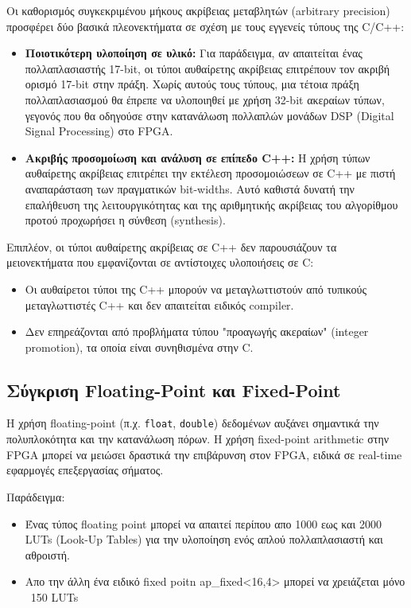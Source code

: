 Οι καθορισμός συγκεκριμένου μήκους ακρίβειας μεταβλητών (arbitrary precision) προσφέρει δύο βασικά πλεονεκτήματα σε σχέση με τους εγγενείς τύπους της C/C++:
\begin{itemize}
  \item \textbf{Ποιοτικότερη υλοποίηση σε υλικό:} Για παράδειγμα, αν απαιτείται ένας πολλαπλασιαστής 17-bit, οι τύποι αυθαίρετης ακρίβειας επιτρέπουν τον ακριβή ορισμό 17-bit στην πράξη.
  Χωρίς αυτούς τους τύπους, μια τέτοια πράξη πολλαπλασιασμού θα έπρεπε να υλοποιηθεί με χρήση 32-bit ακεραίων τύπων, γεγονός που θα οδηγούσε στην κατανάλωση πολλαπλών μονάδων DSP (Digital Signal Processing) στο FPGA.
  \item \textbf{Ακριβής προσομοίωση και ανάλυση σε επίπεδο C++:} Η χρήση τύπων αυθαίρετης ακρίβειας επιτρέπει την εκτέλεση προσομοιώσεων σε C++ με πιστή αναπαράσταση των πραγματικών bit-widths. Αυτό καθιστά δυνατή την επαλήθευση της λειτουργικότητας και της αριθμητικής ακρίβειας του αλγορίθμου προτού προχωρήσει η σύνθεση (synthesis).
\end{itemize}

Επιπλέον, οι τύποι αυθαίρετης ακρίβειας σε C++ δεν παρουσιάζουν τα μειονεκτήματα που εμφανίζονται σε αντίστοιχες υλοποιήσεις σε C:
\begin{itemize}
  \item Οι αυθαίρετοι τύποι της C++ μπορούν να μεταγλωττιστούν από τυπικούς μεταγλωττιστές C++ και δεν απαιτείται ειδικός compiler.
  \item Δεν επηρεάζονται από προβλήματα τύπου "προαγωγής ακεραίων" (integer promotion), τα οποία είναι συνηθισμένα στην C.
\end{itemize}

\subsection{Σύγκριση Floating-Point και Fixed-Point}
Η χρήση floating-point (π.χ. \texttt{float}, \texttt{double}) δεδομένων αυξάνει σημαντικά την πολυπλοκότητα και την κατανάλωση πόρων.
Η χρήση fixed-point arithmetic στην FPGA μπορεί να μειώσει δραστικά την επιβάρυνση στον FPGA, ειδικά σε real-time εφαρμογές επεξεργασίας σήματος.

Παράδειγμα:
\begin{itemize}
  \item Ένας τύπος floating point μπορεί να απαιτεί περίπου απο 1000 εως και 2000 LUTs (Look-Up Tables) για την υλοποίηση ενός απλού πολλαπλασιαστή και αθροιστή.
  \item Απο την άλλη ένα ειδικό fixed poitn ap\_fixed<16,4> μπορεί να χρειάζεται μόνο ~150 LUTs
\end{itemize}

